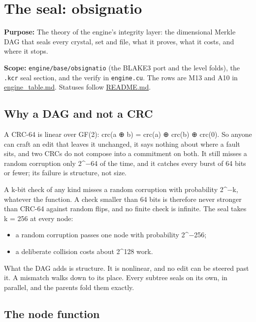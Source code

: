 \chapter{\texorpdfstring{The seal: obsignatio}{The seal: obsignatio}}
\label{chap:obsignatio-seal}

\textbf{Purpose:} The theory of the engine's integrity layer: the dimensional Merkle DAG that seals every crystal, set and file, what it proves, what it costs, and where it stops.

\textbf{Scope:} \texttt{engine/\allowbreak{}base/\allowbreak{}obsignatio} (the BLAKE3 port and the level folds), the \texttt{.\allowbreak{}kcr} seal section, and the verify in \texttt{engine.\allowbreak{}cu}. The rows are M13 and A10 in \hyperref[chap:engine-table]{engine\_\allowbreak{}table.md}. Statuses follow \hyperref[chap:readme]{README.md}.

\section{\texorpdfstring{Why a DAG and not a CRC}{Why a DAG and not a CRC}}

A CRC-64 is linear over GF(2): crc(a ⊕ b) = crc(a) ⊕ crc(b) ⊕ crc(0). So anyone can craft an edit that leaves it unchanged, it says nothing about where a fault sits, and two CRCs do not compose into a commitment on both. It still misses a random corruption only 2\textasciicircum{}−64 of the time, and it catches every burst of 64 bits or fewer; its failure is structure, not size.

A k-bit check of any kind misses a random corruption with probability 2\textasciicircum{}−k, whatever the function. A check smaller than 64 bits is therefore never stronger than CRC-64 against random flips, and no finite check is infinite. The seal takes k = 256 at every node:

\begin{itemize}
\item a random corruption passes one node with probability 2\textasciicircum{}−256;
\item a deliberate collision costs about 2\textasciicircum{}128 work.
\end{itemize}

What the DAG adds is structure. It is nonlinear, and no edit can be steered past it. A mismatch walks down to its place. Every subtree seals on its own, in parallel, and the parents fold them exactly.

\section{\texorpdfstring{The node function}{The node function}}

